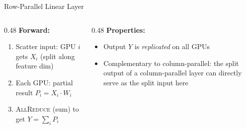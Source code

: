 \begin{frame}{Row-Parallel Linear Layer}
\begin{center}
{}
  \end{center}

  \vspace{0.2em}
  \begin{columns}
    \begin{column}{0.48\textwidth}
      \textbf{Forward:}
      \begin{enumerate}
        \item Scatter input: GPU $i$ gets $X_i$ (split along feature dim)
        \item Each GPU: partial result $P_i = X_i \cdot W_i$
        \item \textsc{AllReduce} (sum) to get $Y = \sum_i P_i$
      \end{enumerate}
    \end{column}
    \begin{column}{0.48\textwidth}
      \textbf{Properties:}
      \begin{itemize}
        \item Output $Y$ is \emph{replicated} on all GPUs
        \item Complementary to column-parallel: the split output of a column-parallel layer can directly serve as the split input here
      \end{itemize}
    \end{column}
  \end{columns}
\end{frame}

